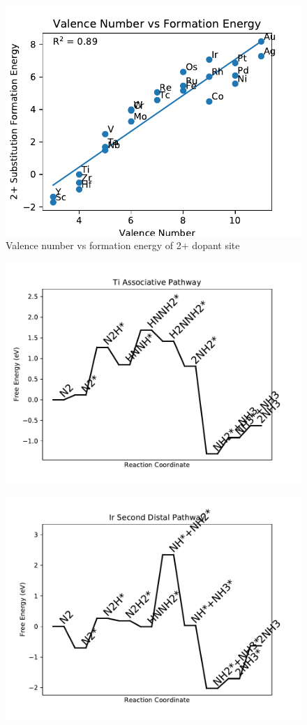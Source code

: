 \begin{figure}
\centering
\includegraphics[width=0.8\linewidth]{Images/Valence_vs_formation_energy.pdf}
\caption{Valence number vs formation energy of 2+ dopant site}
\end{figure}

\begin{figure}
\includegraphics[width=0.8\linewidth]{data/plots/Ti_associative.pdf}
\end{figure}

\begin{figure}
\includegraphics[width=0.8\linewidth]{data/plots/Ir_distal_2.pdf}
\end{figure}

